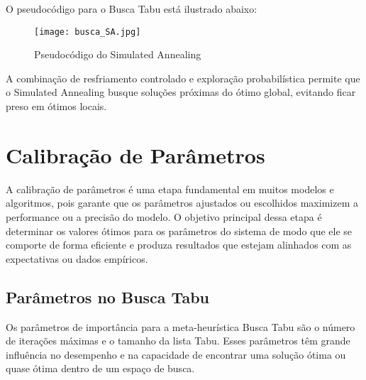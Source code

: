 \documentclass[12pt]{article}
\begin{document}
O pseudocódigo para o Busca Tabu está ilustrado abaixo:

\begin{figure}[h]  
    \centering 
    \texttt{[image: busca\_SA.jpg]}  
    \caption{Pseudocódigo do Simulated Annealing}  %
    \label{fig:busca_SA}  %
\end{figure}

A combinação de resfriamento controlado e exploração probabilística permite que o Simulated Annealing busque soluções próximas do ótimo global, evitando ficar preso em ótimos locais.



\section{Calibração de Parâmetros}

A calibração de parâmetros é uma etapa fundamental em muitos modelos e algoritmos, pois garante que os parâmetros ajustados ou escolhidos maximizem a performance ou a precisão do modelo. O objetivo principal dessa etapa é determinar os valores ótimos para os parâmetros do sistema de modo que ele se comporte de forma eficiente e produza resultados que estejam alinhados com as expectativas ou dados empíricos.

\subsection{Parâmetros no Busca Tabu}

Os parâmetros de importância para a meta-heurística Busca Tabu são o número de iterações máximas e o tamanho da lista Tabu. Esses parâmetros têm grande influência no desempenho e na capacidade de encontrar uma solução ótima ou quase ótima dentro de um espaço de busca.
\end{document}
